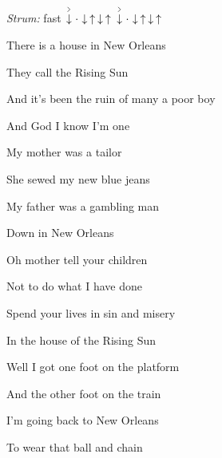 \begin{song}


 \quad
\textit{Strum:} fast $\AccentDown\Miss\Down\Up\Down\Up\ \AccentDown\Miss\Down\Up\Down\Up$

\large


\Large

\bigskip

    \par
{}    \par

\bigskip

There is a house in New Orleans  \par
They call the Rising Sun  \par
And it’s been the ruin of many a poor boy  \par
And God I know I’m one  \par

\bigskip

My mother was a tailor  \par
She sewed my new blue jeans  \par
My father was a gambling man \par
{}Down in New Orleans  \par

\bigskip

Oh mother  tell your children  \par
Not to do what I have done  \par
{}Spend your lives in sin and misery \par
In the house of the Rising Sun  \par

\bigskip

Well I got one foot  on the platform  \par
And the other foot on the train  \par
I’m going back to New Orleans  \par
To wear that ball and chain  \par


\end{song}

